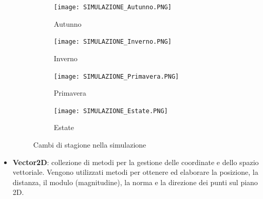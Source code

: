 \documentclass[11pt]{article}
\begin{document}
\begin{itemize}
\begin{figure}[h!]
	\hspace{-5mm}
	\begin{subfigure}{.5\textwidth}
         \centering
         \texttt{[image: SIMULAZIONE\_Autunno.PNG]}
         \caption{Autunno}
         \label{fig:autunno}
	\end{subfigure}
	\begin{subfigure}{.5\textwidth}
		\hspace{7mm}
		\centering
        \texttt{[image: SIMULAZIONE\_Inverno.PNG]}
        \caption{Inverno}
        \label{fig:inverno}
	\end{subfigure}

	\hspace{-5mm}
	\begin{subfigure}{.5\textwidth}
         \centering
         \texttt{[image: SIMULAZIONE\_Primavera.PNG]}
         \caption{Primavera}
         \label{fig:primavera}
	\end{subfigure}
	\begin{subfigure}{.5\textwidth}
		\hspace{7mm}
		\centering
        \texttt{[image: SIMULAZIONE\_Estate.PNG]}
        \caption{Estate}
        \label{fig:estate}
	\end{subfigure}
	\caption{Cambi di stagione nella simulazione}
\end{figure}



    \item \textbf{Vector2D}: collezione di metodi per la gestione delle coordinate e dello spazio vettoriale. Vengono utilizzati metodi per ottenere ed elaborare la posizione, la distanza, il modulo (magnitudine), la norma e la direzione dei punti sul piano 2D.
    

\end{itemize}
\end{document}
